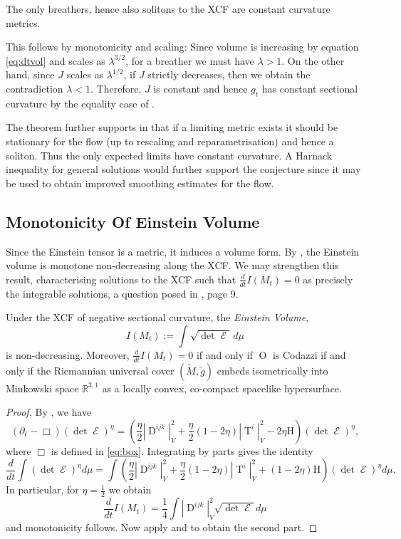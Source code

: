 \documentclass{cambridge7a}
\renewcommand{\~}{\tilde}
\renewcommand{\-}{\bar}
\newcommand{\R}{\mathbb{R}}
\newcommand{\8}{\infty}
\DeclareMathOperator{\opEin}{\mathcal{E}}
\DeclareMathOperator{\Ob}{O}
\DeclareMathOperator{\T}{T}
\DeclareMathOperator{\Dv}{D}
\begin{document}
\begin{thm}[{\cite{MR2302600}}]
The only breathers, hence also solitons to the XCF are constant curvature metrics.
\end{thm}

This follows by monotonicity and scaling: Since volume is increasing by equation \eqref{eq:dtvol} and scales as \(\lambda^{3/2}\), for a breather we must have \(\lambda > 1\). On the other hand, since \(J\) scales as \(\lambda^{1/2}\), if \(J\) strictly decreases, then we obtain the contradiction \(\lambda < 1\). Therefore, \(J\) is constant and hence \(g_t\) has constant sectional curvature by the equality case of .

The theorem further supports  in that if a limiting metric exists it should be stationary for the flow (up to rescaling and reparametrisation) and hence a soliton. Thus the only expected limits have constant curvature. A Harnack inequality for general solutions would further support the conjecture since it may be used to obtain improved smoothing estimates for the flow.

\subsection{Monotonicity Of Einstein Volume}
\label{subsec:xcf_volume}

Since the Einstein tensor is a metric, it induces a volume form. By \cite[Proposition 9]{MR2055396}, the Einstein volume is monotone non-decreasing along the XCF. We may strengthen this result, characterising solutions to the XCF such that \(\frac{d}{dt} I(M_t) = 0\) as precisely the integrable solutions, a question posed in \cite{MR2055396}, page 9.

\begin{thm}
\label{thm:volume_monotonicity}
Under the XCF of negative sectional curvature, the \emph{Einstein Volume},
\[
I(M_t):=\int \sqrt{\det\opEin}\,d\mu
\]
is non-decreasing. Moreover, \(\frac{d}{dt} I(M_t)= 0\) if and only if \(\Ob\) is Codazzi if and only if the Riemannian universal cover \((\tilde{M}, \tilde{g})\) embeds isometrically into Minkowski space \(\R^{3,1}\) as a locally convex, co-compact spacelike hypersurface.
\end{thm}

\begin{proof}
By \cite[Proposition 9]{MR2055396}, we have
\[
(\partial_t - \Box) (\det\opEin)^\eta = \left(\frac{\eta}{2}|\Dv^{ijk}|_V^2 + \frac{\eta}{2}(1-2\eta)|\T^i|^2_V - 2\eta \mathrm{H}\right)(\det\opEin)^\eta,
\]
where \(\Box\) is defined in \eqref{eq:box}. Integrating by parts gives the identity
\[
\frac{d}{dt}\int(\det\opEin)^\eta d\mu = \int \left(\frac{\eta}{2}|\Dv^{ijk}|_V^2 + \frac{\eta}{2}(1-2\eta)|\T^i|^2_V + (1-2\eta)\mathrm{H}\right)(\det\opEin)^\eta d\mu.
\]
In particular, for $\eta=\frac{1}{2}$ we obtain
\[
\frac{d}{dt}I(M_t) = \frac{1}{4}\int |\Dv^{ijk}|_V^2\sqrt{\det\opEin}d\mu
\]
and monotonicity follows. Now apply  and  to obtain the second part.
\end{proof}
\end{document}
